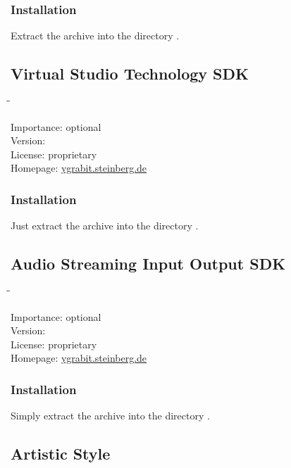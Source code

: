 \subsubsection{Installation}

Extract the archive into the directory .

\subsection{Virtual Studio Technology SDK}

\begin{tabbing}
  \hspace*{6em}\=\=\kill

  Importance:  \> optional \\
  Version:      \\
  License:     \> proprietary \\
  Homepage:    \> \href{http://ygrabit.steinberg.de/}{ygrabit.steinberg.de}
\end{tabbing}

\subsubsection{Installation}

Just extract the archive into the directory
.

\subsection{Audio Streaming Input Output SDK}

\begin{tabbing}
  \hspace*{6em}\=\=\kill

  Importance:  \> optional \\
  Version:      \\
  License:     \> proprietary \\
  Homepage:    \> \href{http://ygrabit.steinberg.de/}{ygrabit.steinberg.de}
\end{tabbing}

\subsubsection{Installation}

Simply extract the archive into the directory
.

\subsection{Artistic Style}

